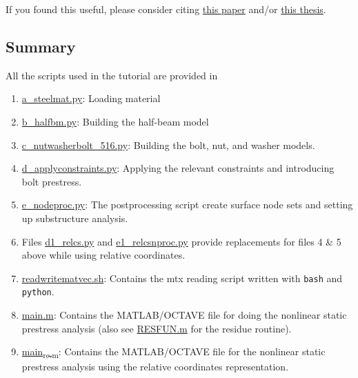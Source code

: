\documentclass[11pt]{article}
\begin{document}
If you found this useful, please consider citing \href{https://www.sciencedirect.com/science/article/abs/pii/S0888327020300017}{this paper} and/or \href{https://scholarship.rice.edu/handle/1911/113700}{this thesis}.
\subsection{Summary}
\label{sec:org3199eb8}
All the scripts used in the tutorial are provided in 
\begin{enumerate}
\item \href{https://github.com/Nidish96/Abaqus4Joints/blob/main/scripts/a\_steelmat.py}{a\_steelmat.py}: Loading material
\item \href{https://github.com/Nidish96/Abaqus4Joints/blob/main/scripts/b\_halfbm.py}{b\_halfbm.py}: Building the half-beam model
\item \href{https://github.com/Nidish96/Abaqus4Joints/blob/main/scripts/c\_nutwasherbolt\_516.py}{c\_nutwasherbolt\_516.py}: Building the bolt, nut, and washer models.
\item \href{https://github.com/Nidish96/Abaqus4Joints/blob/main/scripts/d\_applyconstraints.py}{d\_applyconstraints.py}: Applying the relevant constraints and introducing bolt prestress.
\item \href{https://github.com/Nidish96/Abaqus4Joints/blob/main/scripts/e\_nodeproc.py}{e\_nodeproc.py}: The postprocessing script create surface node sets and setting up substructure analysis.
\item Files \href{https://github.com/Nidish96/Abaqus4Joints/blob/main/scripts/d1\_relcs.py}{d1\_relcs.py} and \href{https://github.com/Nidish96/Abaqus4Joints/blob/main/scripts/e1\_relcsnproc.py}{e1\_relcsnproc.py} provide replacements for files 4 \& 5 above while using relative coordinates.
\item \href{https://github.com/Nidish96/Abaqus4Joints/blob/main/scripts/readwritematvec.sh}{readwritematvec.sh}: Contains the mtx reading script written with \texttt{bash} and \texttt{python}.
\item \href{https://github.com/Nidish96/Abaqus4Joints/blob/main/assets/demo/main.m}{main.m}: Contains the MATLAB/OCTAVE file for doing the nonlinear static prestress analysis (also see \href{https://github.com/Nidish96/Abaqus4Joints/blob/main/assets/demo/RESFUN.m}{RESFUN.m} for the residue routine).
\item \href{https://github.com/Nidish96/Abaqus4Joints/blob/main/assets/demo/main\_rc.m}{main\textsubscript{rc.m}}: Contains the MATLAB/OCTAVE file for the nonlinear static prestress analysis using the relative coordinates representation.
\end{enumerate}
\end{document}
